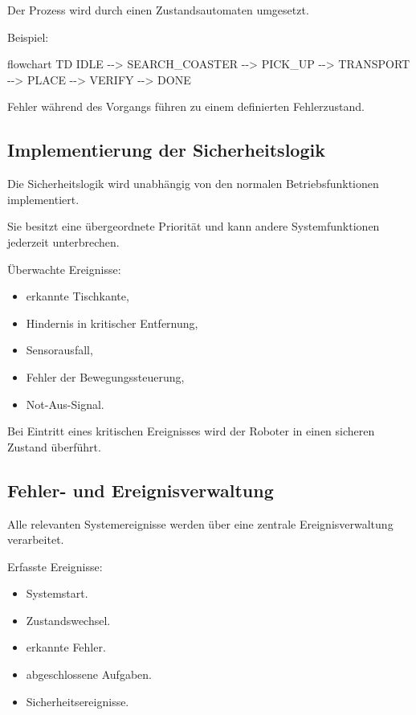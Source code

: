 \documentclass[
  a4paper,
  12pt,
  DIV=12,        %
  parskip=half,  %
  headings=small %
]{scrartcl}
\theoremstyle{definition}
\providecommand{\tightlist}{%
  \setlength{\itemsep}{0pt}\setlength{\parskip}{0pt}}
\theoremstyle{definition}
\newenvironment{Shaded}{}{}
\newcommand{\NormalTok}[1]{#1}
\begin{document}
Der Prozess wird durch einen Zustandsautomaten umgesetzt.

Beispiel:

\begin{Shaded}
\begin{Highlighting}[]
\NormalTok{flowchart TD}
\NormalTok{IDLE {-}{-}\textgreater{} SEARCH\_COASTER {-}{-}\textgreater{} PICK\_UP {-}{-}\textgreater{} TRANSPORT {-}{-}\textgreater{} PLACE {-}{-}\textgreater{} VERIFY {-}{-}\textgreater{} DONE}
\end{Highlighting}
\end{Shaded}

Fehler während des Vorgangs führen zu einem definierten Fehlerzustand.

\subsection{Implementierung der
Sicherheitslogik}\label{implementierung-der-sicherheitslogik}

Die Sicherheitslogik wird unabhängig von den normalen Betriebsfunktionen
implementiert.

Sie besitzt eine übergeordnete Priorität und kann andere
Systemfunktionen jederzeit unterbrechen.

Überwachte Ereignisse:

\begin{itemize}
\tightlist
\item
  erkannte Tischkante,
\item
  Hindernis in kritischer Entfernung,
\item
  Sensorausfall,
\item
  Fehler der Bewegungssteuerung,
\item
  Not-Aus-Signal.
\end{itemize}

Bei Eintritt eines kritischen Ereignisses wird der Roboter in einen
sicheren Zustand überführt.

\subsection{Fehler- und
Ereignisverwaltung}\label{fehler--und-ereignisverwaltung}

Alle relevanten Systemereignisse werden über eine zentrale
Ereignisverwaltung verarbeitet.

Erfasste Ereignisse:

\begin{itemize}
\tightlist
\item
  Systemstart.
\item
  Zustandswechsel.
\item
  erkannte Fehler.
\item
  abgeschlossene Aufgaben.
\item
  Sicherheitsereignisse.
\end{itemize}
\end{document}

